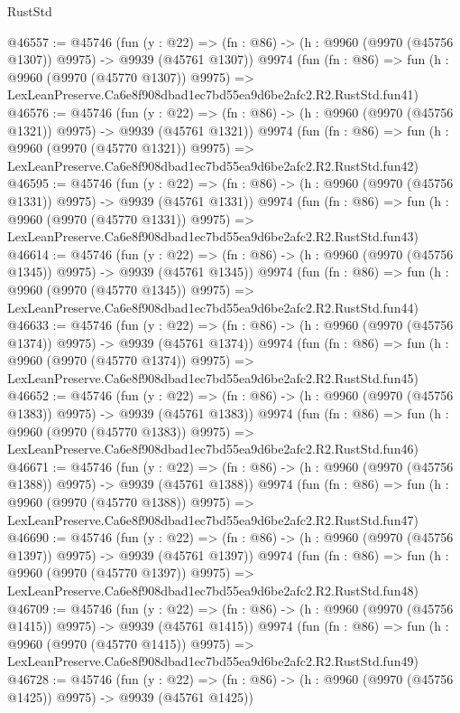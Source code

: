 \begin{lexlean}{RustStd}
\begin{coremodule}
@46557 := @45746
    (fun (y : @22) =>
    (fn : @86) -> (h : @9960 (@9970 (@45756 @1307)) @9975) -> @9939 (@45761 @1307))
    @9974
    (fun (fn : @86) =>
    fun (h : @9960 (@9970 (@45770 @1307)) @9975) =>
    LexLeanPreserve.Ca6e8f908dbad1ec7bd55ea9d6be2afc2.R2.RustStd.fun41)
@46576 := @45746
    (fun (y : @22) =>
    (fn : @86) -> (h : @9960 (@9970 (@45756 @1321)) @9975) -> @9939 (@45761 @1321))
    @9974
    (fun (fn : @86) =>
    fun (h : @9960 (@9970 (@45770 @1321)) @9975) =>
    LexLeanPreserve.Ca6e8f908dbad1ec7bd55ea9d6be2afc2.R2.RustStd.fun42)
@46595 := @45746
    (fun (y : @22) =>
    (fn : @86) -> (h : @9960 (@9970 (@45756 @1331)) @9975) -> @9939 (@45761 @1331))
    @9974
    (fun (fn : @86) =>
    fun (h : @9960 (@9970 (@45770 @1331)) @9975) =>
    LexLeanPreserve.Ca6e8f908dbad1ec7bd55ea9d6be2afc2.R2.RustStd.fun43)
@46614 := @45746
    (fun (y : @22) =>
    (fn : @86) -> (h : @9960 (@9970 (@45756 @1345)) @9975) -> @9939 (@45761 @1345))
    @9974
    (fun (fn : @86) =>
    fun (h : @9960 (@9970 (@45770 @1345)) @9975) =>
    LexLeanPreserve.Ca6e8f908dbad1ec7bd55ea9d6be2afc2.R2.RustStd.fun44)
@46633 := @45746
    (fun (y : @22) =>
    (fn : @86) -> (h : @9960 (@9970 (@45756 @1374)) @9975) -> @9939 (@45761 @1374))
    @9974
    (fun (fn : @86) =>
    fun (h : @9960 (@9970 (@45770 @1374)) @9975) =>
    LexLeanPreserve.Ca6e8f908dbad1ec7bd55ea9d6be2afc2.R2.RustStd.fun45)
@46652 := @45746
    (fun (y : @22) =>
    (fn : @86) -> (h : @9960 (@9970 (@45756 @1383)) @9975) -> @9939 (@45761 @1383))
    @9974
    (fun (fn : @86) =>
    fun (h : @9960 (@9970 (@45770 @1383)) @9975) =>
    LexLeanPreserve.Ca6e8f908dbad1ec7bd55ea9d6be2afc2.R2.RustStd.fun46)
@46671 := @45746
    (fun (y : @22) =>
    (fn : @86) -> (h : @9960 (@9970 (@45756 @1388)) @9975) -> @9939 (@45761 @1388))
    @9974
    (fun (fn : @86) =>
    fun (h : @9960 (@9970 (@45770 @1388)) @9975) =>
    LexLeanPreserve.Ca6e8f908dbad1ec7bd55ea9d6be2afc2.R2.RustStd.fun47)
@46690 := @45746
    (fun (y : @22) =>
    (fn : @86) -> (h : @9960 (@9970 (@45756 @1397)) @9975) -> @9939 (@45761 @1397))
    @9974
    (fun (fn : @86) =>
    fun (h : @9960 (@9970 (@45770 @1397)) @9975) =>
    LexLeanPreserve.Ca6e8f908dbad1ec7bd55ea9d6be2afc2.R2.RustStd.fun48)
@46709 := @45746
    (fun (y : @22) =>
    (fn : @86) -> (h : @9960 (@9970 (@45756 @1415)) @9975) -> @9939 (@45761 @1415))
    @9974
    (fun (fn : @86) =>
    fun (h : @9960 (@9970 (@45770 @1415)) @9975) =>
    LexLeanPreserve.Ca6e8f908dbad1ec7bd55ea9d6be2afc2.R2.RustStd.fun49)
@46728 := @45746
    (fun (y : @22) =>
    (fn : @86) -> (h : @9960 (@9970 (@45756 @1425)) @9975) -> @9939 (@45761 @1425))

\end{coremodule}
\end{lexlean}
